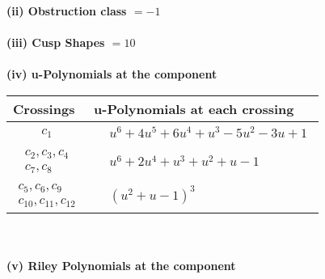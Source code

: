 \documentclass[1p]{elsarticle_modified}
\theoremstyle{definition}
\begin{document}
\flushleft \textbf{(ii) Obstruction class $= -1$}\\~\\
\flushleft \textbf{(iii) Cusp Shapes $= 10$}\\~\\
\newpage\renewcommand{\arraystretch}{1}
\flushleft \textbf{(iv) u-Polynomials at the component}\newline \\
\begin{tabular}{m{50pt}|m{274pt}}
Crossings & \hspace{64pt}u-Polynomials at each crossing \\
\hline $$\begin{aligned}c_{1}\end{aligned}$$&$\begin{aligned}
&u^6+4 u^5+6 u^4+u^3-5 u^2-3 u+1
\end{aligned}$\\
\hline $$\begin{aligned}c_{2},c_{3},c_{4}\\c_{7},c_{8}\end{aligned}$$&$\begin{aligned}
&u^6+2 u^4+u^3+u^2+u-1
\end{aligned}$\\
\hline $$\begin{aligned}c_{5},c_{6},c_{9}\\c_{10},c_{11},c_{12}\end{aligned}$$&$\begin{aligned}
&(u^2+u-1)^3
\end{aligned}$\\
\hline
\end{tabular}\\~\\
\newpage\renewcommand{\arraystretch}{1}
\flushleft \textbf{(v) Riley Polynomials at the component}\newline \\
\end{document}
